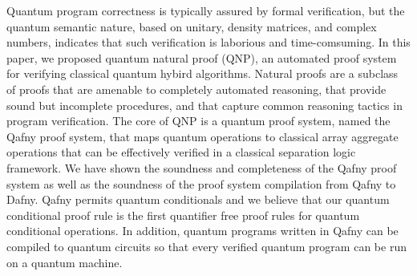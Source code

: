 Quantum program correctness is typically assured by formal verification, but the quantum semantic nature, based on unitary, density matrices, and complex numbers, indicates that such verification is laborious and time-comsuming. 
In this paper, we proposed quantum natural proof (QNP), an automated proof system for verifying classical quantum hybird algorithms. 
Natural proofs are a subclass of proofs that are amenable to completely automated reasoning, that provide sound but incomplete procedures, and that capture common reasoning tactics in program verification. 
The core of QNP is a quantum proof system, named the Qafny proof system, that maps quantum operations to classical array aggregate operations that can be effectively verified in a classical separation logic framework. We have shown the soundness and completeness of the Qafny proof system as well as the soundness of the proof system compilation from Qafny to Dafny.
Qafny permits quantum conditionals and we believe that our quantum conditional proof rule is the first quantifier free proof rules for quantum conditional operations.
In addition, quantum programs written in Qafny can be compiled to quantum circuits so that every verified quantum program can be run on a quantum machine. 

